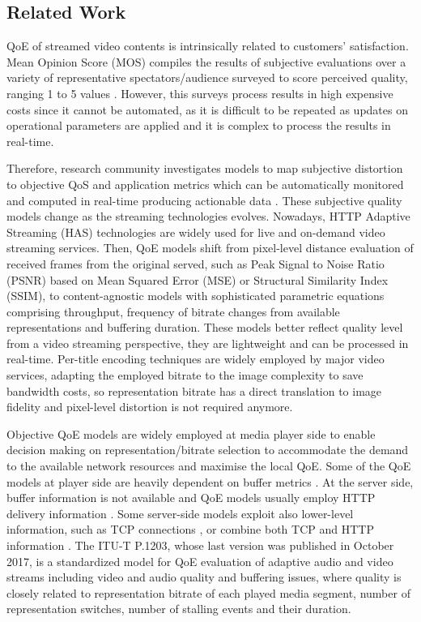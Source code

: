 \subsection{Related Work}
\label{sec:MTAP20202}

QoE of streamed video contents is intrinsically related to customers' satisfaction. Mean Opinion Score (MOS) compiles the results of subjective evaluations over a variety of representative spectators/audience surveyed to score perceived quality, ranging 1 to 5 values \cite{Itu2016}. However, this surveys process results in high expensive costs since it cannot be automated, as it is difficult to be repeated as updates on operational parameters are applied and it is complex to process the results in real-time.

Therefore, research community investigates models to map subjective distortion to objective QoS and application metrics which can be automatically monitored and computed in real-time producing actionable data \cite{Juluri2015}.
These subjective quality models change as the streaming technologies evolves. Nowadays, HTTP Adaptive Streaming (HAS) technologies are widely used for live and \hbox{on-demand} video streaming services. Then, QoE models shift from \hbox{pixel-level} distance evaluation of received frames from the original served, such as Peak Signal to Noise Ratio (PSNR) based on Mean Squared Error (MSE) or Structural Similarity Index (SSIM), to \hbox{content-agnostic} models with sophisticated parametric equations comprising throughput, frequency of bitrate changes from available representations and buffering duration. These models better reflect quality level from a video streaming perspective, they are lightweight and can be processed in \hbox{real-time}. \hbox{Per-title} encoding techniques \cite{cock2016} are widely employed by major video services, adapting the employed bitrate to the image complexity to save bandwidth costs, so representation bitrate has a direct translation to image fidelity and \hbox{pixel-level} distortion is not required anymore.

Objective QoE models \cite{liotou2016} are widely employed at media player side to enable decision making on representation/bitrate selection to accommodate the demand to the available network resources and maximise the local QoE. Some of the QoE models at player side are heavily dependent on buffer metrics \cite{huang2018}. At the server side, buffer information is not available and QoE models usually employ HTTP delivery information \cite{mangla2017}. Some server-side models exploit also lower-level information, such as TCP connections \cite{mangla2018}, or combine both TCP and HTTP information \cite{mazhar2018}. The ITU-T P.1203, whose last version was published in October 2017, is a standardized model for QoE evaluation of adaptive audio and video streams including video and audio quality and buffering issues, where quality is closely related to representation bitrate of each played media segment, number of representation switches, number of stalling events and their duration.

